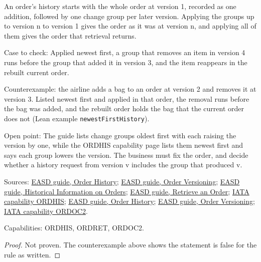 \begin{theorem}
  \label{thm:order-creation-history-rebuilds-versions}
  An order's history starts with the whole order at version 1, recorded as
  one addition, followed by one change group per later version. Applying the
  groups up to version n to version 1 gives the order as it was at version
  n, and applying all of them gives the order that retrieval returns.

  Case to check: Applied newest first, a group that removes an item in
  version 4 runs before the group that added it in version 3, and the item
  reappears in the rebuilt current order.

  Counterexample: the airline adds a bag to an order at version 2 and removes
  it at version 3.  Listed newest first and applied in that order, the removal
  runs before the bag was added, and the rebuilt order holds the bag that the
  current order does not (Lean example \texttt{newestFirstHistory}).

  Open point: The guide lists change groups oldest first with each raising
  the version by one, while the ORDHIS capability page lists them newest
  first and says each group lowers the version. The business must fix the
  order, and decide whether a history request from version v includes the
  group that produced v.

  Sources: \href{https://standards.atlassian.net/wiki/spaces/EASD/pages/574652557/Order+History}{EASD guide, Order History};
  \href{https://standards.atlassian.net/wiki/spaces/EASD/pages/574259659/Order+Versioning}{EASD guide, Order Versioning};
  \href{https://standards.atlassian.net/wiki/spaces/EASD/pages/574816364/Historical+Information+on+Orders}{EASD guide, Historical Information on Orders};
  \href{https://standards.atlassian.net/wiki/spaces/EASD/pages/574455891/Retrieve+an+Order}{EASD guide, Retrieve an Order};
  \href{https://retailing.iata.org/armi/docs/ORDHIS/}{IATA capability ORDHIS};
  \href{https://standards.atlassian.net/wiki/spaces/EASD/pages/574652557}{EASD guide, Order History};
  \href{https://standards.atlassian.net/wiki/spaces/EASD/pages/574259659}{EASD guide, Order Versioning};
  \href{https://retailing.iata.org/armi/docs/ORDOC2/}{IATA capability ORDOC2}.

  Capabilities: ORDHIS, ORDRET, ORDOC2.
\end{theorem}
\begin{proof}
  Not proven.  The counterexample above shows the statement is false for the
  rule as written.
\end{proof}

